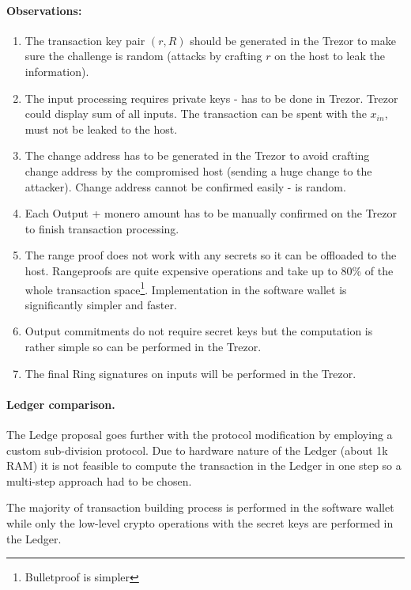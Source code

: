 \documentclass[]{article}
\begin{document}
\paragraph{Observations:}
\begin{enumerate}
	\item The transaction key pair $(r,R)$ should be generated in the Trezor to make sure the challenge is random (attacks by crafting $r$ on the host to leak the information). 
	
	\item The input processing requires private keys - has to be done in Trezor. Trezor could display sum of all inputs. The transaction can be spent with the $x_{in}$, must not be leaked to the host.
	
	\item The change address has to be generated in the Trezor to avoid crafting change address by the compromised host (sending a huge change to the attacker). Change address cannot be confirmed easily - is random.
	
	\item Each Output + monero amount has to be manually confirmed on the Trezor to finish transaction processing.
	
	\item The range proof does not work with any secrets so it can be offloaded to the host. Rangeproofs are quite expensive operations and take up to 80\% of the whole transaction space\footnote{Bulletproof is simpler}. Implementation in the software wallet is significantly simpler and faster.
	
	\item Output commitments do not require secret keys but the computation is rather simple so can be performed in the Trezor.
	
	\item The final Ring signatures on inputs will be performed in the Trezor.
\end{enumerate}

\paragraph{Ledger comparison.} The Ledge proposal \cite{ledger_doc} goes further with the protocol modification by employing a custom sub-division protocol. Due to hardware nature of the Ledger (about 1k RAM) it is not feasible to compute the transaction in the Ledger in one step so a multi-step approach had to be chosen.

The majority of transaction building process is performed in the software wallet while only the low-level crypto operations with the secret keys are performed in the Ledger.  
\end{document}
